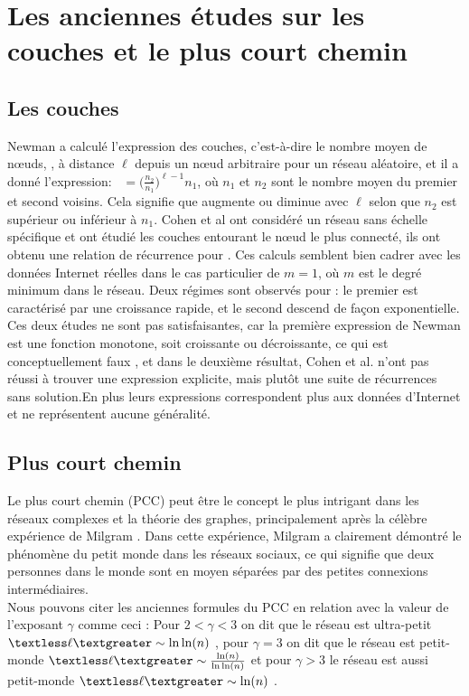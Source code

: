 \section{Les anciennes études sur les couches et le plus court chemin}
\subsection{Les couches}
Newman \cite{Newman2010-456} a calculé l'expression des couches, c'est-à-dire le nombre moyen de nœuds, \nl, à distance $\ell$ depuis un nœud arbitraire pour un réseau aléatoire, et il a donné l'expression: ~\nl$=\Big(\frac{n_2}{n_1}\Big)^{\ell-1}n_1$, où $n_1$ et $n_2$ sont le nombre moyen du premier et second voisins. Cela signifie que \nl augmente ou diminue avec $\ell$ selon que $n_2$ est supérieur ou inférieur à $n_1$. Cohen et al \cite{Cohen-Havlinl2010-72,Kalisky-al2006} ont considéré un réseau sans échelle spécifique et ont étudié les couches entourant le nœud le plus connecté, ils ont obtenu une relation de récurrence pour \nl. Ces calculs semblent bien cadrer avec les données Internet réelles dans le cas particulier de $m=1$, où $m$ est le degré minimum dans le réseau. Deux régimes sont observés pour \nl: le premier est caractérisé par une croissance rapide, et le second descend de façon exponentielle.\\
Ces deux études ne sont pas satisfaisantes, car la première expression de Newman est une fonction monotone, soit croissante ou décroissante, ce qui est conceptuellement faux \cite{Cohen-Havlinl2010}, et dans le deuxième résultat, Cohen et al.  n'ont pas réussi à trouver une expression explicite, mais plutôt une suite de récurrences sans solution.En plus leurs expressions correspondent plus aux données d'Internet et ne représentent aucune généralité.
 
\subsection{Plus court chemin}
\label{PCC}
 Le plus court chemin (PCC) peut être le concept le plus intrigant dans les réseaux complexes et la théorie des graphes, principalement après la célèbre expérience de Milgram \cite{Mi1967}. Dans cette expérience, Milgram a clairement démontré le phénomène du petit monde dans les réseaux sociaux, ce qui signifie que deux personnes dans le monde sont en moyen séparées par des petites connexions intermédiaires.\\
 Nous pouvons citer les anciennes formules du PCC  en relation avec la valeur de l'exposant $\gamma$ comme ceci : Pour $2<\gamma<3$ on dit que le réseau est ultra-petit $\textless\ell\textgreater\sim \ln\ln(n)$ \cite{Cohen-Havlin2003,Do-al2003,Cohen-al2002,Chung-Lu2002,Fox-Bellwood2014,Hofstad-al2014}, pour $\gamma=3$ on dit que le réseau est petit-monde $\textless\ell\textgreater\sim\frac{\ln(n)}{\ln\ln(n)}$ \cite{Bollobas1985,Chung-Lu2002,Fronczak-al2004,Hofstad-al2004,Cohen-Havlin2009} et pour $\gamma>3$ le réseau est aussi petit-monde $\textless\ell\textgreater\sim\ln(n)$ \cite{Bollobas1985,Chung-Lu2002,Fronczak-al2004,Hofstad-al2004,Cohen-Havlin2009}.  

